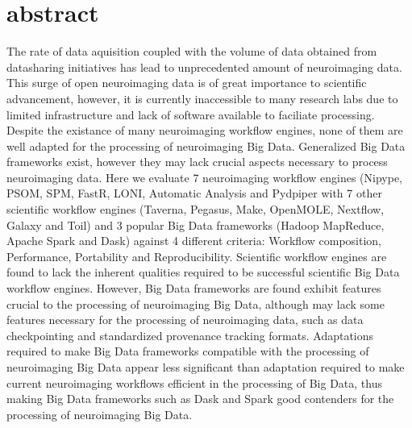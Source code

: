 
    
\section{abstract}
        The rate of data aquisition coupled with the volume of data obtained 
        from datasharing initiatives has lead to unprecedented amount of 
        neuroimaging data. This surge of open neuroimaging data is of great 
        importance to scientific advancement, however, it is currently 
        inaccessible to many research labs due to limited infrastructure and 
        lack of software available to faciliate processing. Despite the existance
        of many neuroimaging workflow engines, none of them are well adapted for
        the processing of neuroimaging Big Data. Generalized Big Data frameworks
        exist, however they may lack crucial aspects necessary to process neuroimaging
        data. Here we evaluate 7 neuroimaging workflow engines (Nipype, PSOM, SPM, FastR,
        LONI, Automatic Analysis and Pydpiper with 7 other scientific workflow
        engines (Taverna, Pegasus, Make, OpenMOLE, Nextflow, Galaxy and Toil) and
        3 popular Big Data frameworks (Hadoop MapReduce, Apache Spark and Dask) 
        against 4 different criteria: Workflow composition, Performance, Portability
        and Reproducibility. Scientific workflow engines are found to lack the 
        inherent qualities required to be successful scientific Big Data workflow 
        engines. However, Big Data frameworks are found exhibit features crucial
        to the processing of neuroimaging Big Data, although may lack some features
        necessary for the processing of neuroimaging data, such as data checkpointing and 
        standardized provenance tracking formats. Adaptations required to make Big
        Data frameworks compatible with the processing of neuroimaging Big Data 
        appear less significant than adaptation required to make current neuroimaging 
        workflows efficient in the processing of Big Data, thus making Big Data frameworks
        such as Dask and Spark good contenders for the processing of neuroimaging Big Data.
        
         
